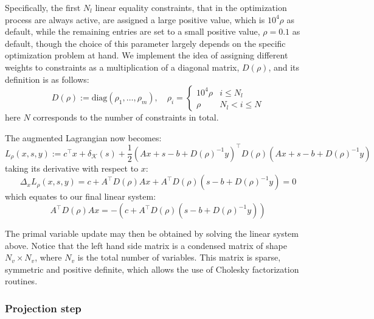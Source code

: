 Specifically, the first 
$N_{l}$  linear equality constraints, that in the optimization process are always active, are assigned a large positive value, which is $10^4 \rho$ as default, while the remaining entries are set to a small positive value, $\rho = 0.1$ as default, though the choice of this parameter largely depends on the specific optimization problem at hand. We implement the idea of assigning different weights to constraints as a multiplication of a diagonal matrix, $D(\rho)$, and its definition is as follows:
\begin{equation}
D(\rho) := \text{diag}(\rho_1, \dots, \rho_m), \quad
\rho_i = \left\{
\begin{array}{ll}
10^4  \rho & i \leq N_l \\
\rho & N_l < i \leq N
\end{array}
\right.
\end{equation}
here $N$ corresponds to the number of constraints in total.


The augmented Lagrangian now becomes: 
\begin{equation}
L_\rho(x,s,y) := c^\top x+ \delta_{\mathcal{K}}(s)+\frac{1}{2}(Ax+s-b+D(\rho)^{-1}y)^\top D(\rho)(Ax+s-b+D(\rho)^{-1}y)
\end{equation} taking its derivative with respect to $x$:
\begin{equation}
\Delta_x L_\rho(x,s,y) = c + A^\top D(\rho) Ax +A^\top D(\rho)  (s-b+D(\rho)^{-1}y) = 0
\end{equation} which equates to our final linear system:
\begin{equation}
A^\top D(\rho)  Ax = -(c+A^\top D(\rho) (s-b+D(\rho)^{-1}y))
\label{eq:KKT}
\end{equation}

The primal variable update may then be obtained by solving the linear system above. Notice that the left hand side matrix is a condensed matrix of shape $N_v \times N_v$, where $N_v$ is the total number of variables. This matrix is sparse, symmetric and positive definite, which allows the use of Cholesky factorization routines.

\subsubsection{Projection step}

